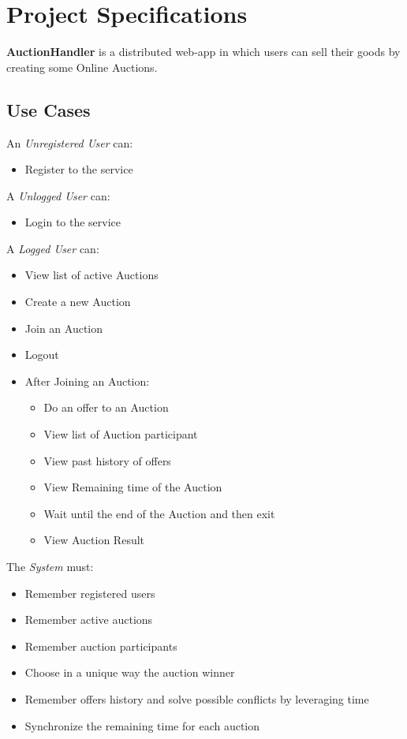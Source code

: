 \section{Project Specifications}

\textbf{AuctionHandler} is a distributed web-app in which users can sell their goods by creating some Online Auctions. 

\subsection{Use Cases}

An \textit{Unregistered User} can:
\begin{itemize}
	\item Register to the service
\end{itemize}
\noindent
A \textit{Unlogged User} can:
\begin{itemize}
	\item Login to the service
\end{itemize}
\noindent
A \textit{Logged User} can:
\begin{itemize}
	\item View list of active Auctions
	\item Create a new Auction
	\item Join an Auction
	\item Logout
	\item After Joining an Auction:
	\begin{itemize}
		\item Do an offer to an Auction
		\item View list of Auction participant
		\item View past history of offers
		\item View Remaining time of the Auction
		\item Wait until the end of the Auction and then exit
		\item View Auction Result
	\end{itemize}
\end{itemize}
The \textit{System} must:
\begin{itemize}
	\item Remember registered users
	\item Remember active auctions
	\item Remember auction participants
	\item Choose in a unique way the auction winner
	\item Remember offers history and solve possible conflicts by leveraging time
	\item Synchronize the remaining time for each auction
\end{itemize}

